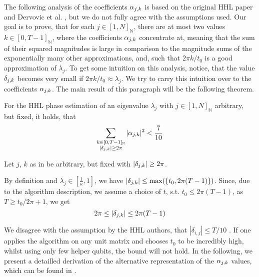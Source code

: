 The following analysis of the coefficients \(\alpha_{j, k}\) is based on the original HHL paper \cite[pp. 10-11]{Harrow2008} and Dervovic et al. \cite[pp. 32-33]{Dervovic2018}, but we do not fully agree with the assumptions used. Our goal is to prove, that for each \(j \in [1, N]_{\mathbb{N}}\), there are at most two values \(k \in [0, T-1]_{\mathbb{N}}\), where the coefficients \(\alpha_{j, k}\) concentrate at, meaning that the sum of their squared magnitudes is large in comparison to the magnitude sums of the exponentially many other approximations, and, such that \(2 \pi k / t_0\) is a good approximation of \(\lambda_j\). To get some intuition on this analysis, notice, that the value \(\delta_{j, k}\) becomes very small if \(2 \pi k / t_0 \approx \lambda_j\). We try to carry this intuition over to the coefficients \(\alpha_{j, k}\). The main result of this paragraph will be the following theorem.

\begin{theorem} \label{alphas_yield_good_approximation}
    For the HHL phase estimation of an eigenvalue \(\lambda_j\) with \(j \in [1, N]_{\mathbb{N}}\) arbitrary, but fixed, it holds, that
    \begin{align}
        \sum_{\substack{k \in [0, T-1]_{\mathbb{N}}\\|\delta_{j, k}| \geq 2\pi}} |\alpha_{j, k}|^2 < \frac{7}{10}
    \end{align}
\end{theorem}

Let \(j\), \(k\) as in  be arbitrary, but fixed with \(|\delta_{j, k}| \geq 2\pi\).

\begin{observation} \label{inner_amplitude_bounds}
    By definition and \(\lambda_j \in \left[\frac{1}{\kappa}, 1\right]\), we have \(|\delta_{j, k}| \leq \max(\{t_0, 2 \pi (T-1)\})\). Since, due to the algorithm description, we assume a choice of \(t\), s.t. \(t_0 \leq 2 \pi (T-1)\), as \(T \geq t_0/2\pi+1\), we get
    \[
        2\pi \leq |\delta_{j, k}| \leq 2 \pi (T-1)
    \]
\end{observation}

We disagree with the assumption by the HHL authors, that \(|\delta_{i, j}| \leq T/10\) \cite[p. 11]{Harrow2008}. If one applies the algorithm on any unit matrix and chooses \(t_0\) to be incredibly high, whilst using only few helper qubits, the bound will not hold. In the following, we present a detailled derivation of the alternative representation of the \(\alpha_{j, k}\) values, which can be found in \cite[p. 11]{Harrow2008}.

